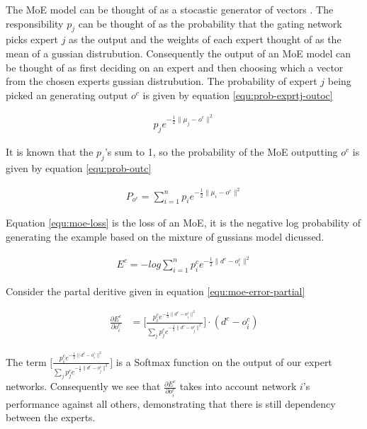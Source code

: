 \documentclass[notitlepage]{report}
\theoremstyle{definition}
\begin{document}
The MoE model can be thought of as a stocastic generator of vectors \cite{jacobs1991adaptive}. The responsibility $p_j$ can be thought of as the probability that the gating network picks expert $j$ as the output and the weights of each expert thought of as the mean of a gussian distrubution. Consequently the output of an MoE model can be thought of as first deciding on an expert and then choosing which a vector from the chosen experts gussian distrubution. The probability of expert $j$ being picked an generating output $o^c$ is given by equation \ref{equ:prob-exprtj-outoc}

\begin{align}
p_je^{-\frac{1}{2} \lVert \mu_j - o^c \lVert^2}
\label{equ:prob-exprtj-outoc}
\end{align}

It is known that the $p_j$'s sum to 1, so the probability of the MoE outputting $o^c$ is given by equation \ref{equ:prob-outc}

\begin{align}
P_{o^c} = \sum_{i=1}^n p_ie^{-\frac{1}{2} \lVert \mu_i - o^c \lVert^2}
\label{equ:prob-outc}
\end{align}

Equation \ref{equ:moe-loss} is the loss of an MoE, it is the negative log probability of generating the example based on the mixture of gussians model dicussed.

\begin{align}
E^c = -log \sum_{i=1}^n p^c_i e^{-\frac{1}{2} \lVert d^c - o_i^c \rVert^2 }
\label{equ:moe-loss}
\end{align}

Consider the partal deritive given in equation \ref{equ:moe-error-partial}

\begin{align}
\frac{\partial E^c}{\partial o_i^c} &= \bigg[ \frac{p_i^c e^{-\frac{1}{2} \lVert d^c - o_i^c \rVert^2}}{\sum_j p_j^c e^{-\frac{1}{2} \lVert d^c - o_j^c \rVert^2}} \bigg] \cdot (d^c - o_i^c)
\label{equ:moe-error-partial}
\end{align}

The term $\bigg[ \frac{p_i^c e^{-\frac{1}{2} \lVert d^c - o_i^c \rVert^2}}{\sum_j p_j^c e^{-\frac{1}{2} \lVert d^c - o_j^c \rVert^2}} \bigg]$ is a Softmax function on the output of our expert networks. Consequently we see that $\frac{\partial E^c}{\partial o_i^c}$ takes into account network $i$'s performance against all others, demonstrating that there is still dependency between the experts.\\
\end{document}
